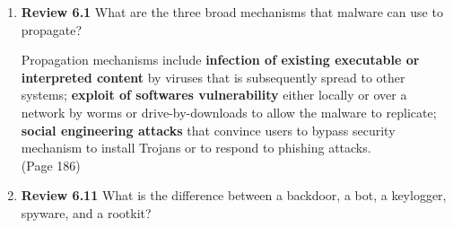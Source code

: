 \documentclass[12pt]{article}
\begin{document}
\renewcommand{\headrulewidth}{0.4pt}

\vspace{-3mm}

\begin{enumerate}

	
	\item {\textbf{Review 6.1} What are the three broad mechanisms that malware can use to propagate?} 
	
	 Propagation mechanisms include \textbf{infection of existing executable or interpreted content} by viruses that is subsequently spread to other systems; \textbf{exploit of softwares vulnerability} either locally or over a network by worms or drive-by-downloads to allow the malware to replicate; \textbf{social engineering attacks} that convince users to bypass security mechanism to install Trojans or to respond to phishing attacks.  \\ (Page 186)

		
	\vspace{10pt}
	
	\item {\textbf{Review 6.11}  What is the difference between a backdoor, a bot, a keylogger, spyware, and a rootkit?}
	

\end{enumerate}
\end{document}

